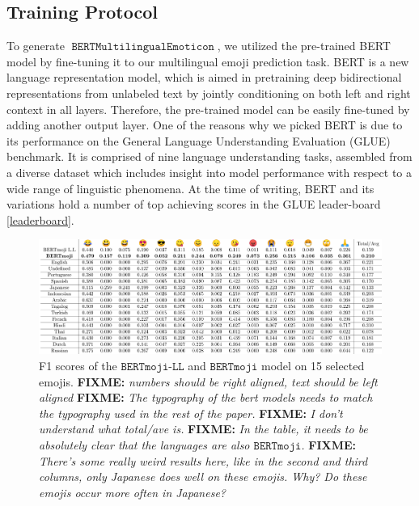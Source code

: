 \documentclass[11pt]{article}
\newcommand{\fixme}[1]{{\color{red} \textbf{FIXME:} {\textit {#1}}}}
\newcommand{\bertmoji}{\texttt{BERTmoji}}
\newcommand{\bertmojill}{\texttt{BERTmoji-LL}}
\DeclareMathOperator{\model}{\texttt{BERTMultilingualEmoticon}}
\begin{document}

\subsection{Training Protocol}

To generate $\model$, we utilized the pre-trained BERT model \cite{bert} by fine-tuning it to our multilingual emoji prediction task. 
BERT is a new language representation model, which is aimed in pretraining deep bidirectional representations from unlabeled text by jointly conditioning on both left and right context in all layers.
Therefore, the pre-trained model can be easily fine-tuned by adding another output layer.
One of the reasons why we picked BERT is due to its performance on the General Language Understanding Evaluation (GLUE) \cite{} benchmark.
It is comprised of nine language understanding tasks, assembled from a diverse dataset which includes insight into model performance with respect to a wide range of linguistic phenomena.
At the time of writing, BERT and its variations hold a number of top achieving scores in the GLUE leader-board \ref{leaderboard}.   

\begin{figure}
    \centering
    \includegraphics[width=\textwidth]{images/F1_LANG_EMOJIS.pdf}
    \caption{
        F1 scores of the $\bertmojill$ and $\bertmoji$ model on 15 selected emojis.
        \fixme{numbers should be right aligned, text should be left aligned}
        \fixme{The typography of the bert models needs to match the typography used in the rest of the paper.}
        \fixme{I don't understand what total/ave is.}
        \fixme{In the table, it needs to be absolutely clear that the languages are also $\bertmoji$.}
        \fixme{There's some really weird results here, like in the second and third columns, only Japanese does well on these emojis.  Why?  Do these emojis  occur more often in Japanese?}
    }
    \label{fig:tweets_per_day}
\end{figure}
\end{document}
